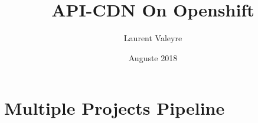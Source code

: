 \documentclass[12pt, letterpaper]{article}
\title{API-CDN On Openshift}
\author{Laurent Valeyre}
\date{Auguste 2018}
\begin{document}
\maketitle
\tableofcontents

\section{Multiple Projects Pipeline}



\listoffigures
\end{document}
